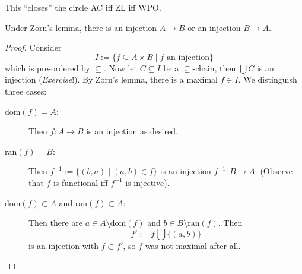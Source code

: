 \documentclass{whrartcl}
\newcommand{\FF}{\mathcal{F}}
\newcommand{\dom}{\text{dom}}
\newcommand{\ran}{\text{ran}}
\begin{document}
\begin{remark}
  This ``closes'' the circle AC iff ZL iff WPO.
\end{remark}

\begin{lemma}
  Under Zorn's lemma, there is an injection $A \to B$ or an injection $B \to A$.
\end{lemma}
\begin{proof}
  Consider
  \[
    I := \{f \subseteq A \times B \mid f \text{ an injection} \}
  \]
  which is pre-ordered by $\subseteq$. Now let $C \subseteq I$ be a
  $\subseteq$-chain, then $\bigcup C$ is an injection (\emph{Exercise}!).
  By Zorn's lemma, there is a maximal $f \in I$. We distinguish three cases:
  \begin{description}
  \item[$\dom(f) = A$:] Then $f : A \to B$ is an injection as desired.
  \item[$\ran(f) = B$:] Then $f^{-1} := \{(b, a) \mid (a, b) \in f\}$ is an
    injection $f^{-1} : B \to A$. (Observe that $f$ is functional iff $f^{-1}$
    is injective).
  \item[$\dom(f) \subset A$ and $\ran(f) \subset A$:] Then there are $a \in A
    \setminus \dom(f)$ and $b \in B \setminus \ran(f)$. Then
    \[
      f' := f \bigcup \{(a, b)\}
    \]
    is an injection with $f \subset f'$, so $f$ was not maximal after all.
  \end{description}
\end{proof}




\end{document}
